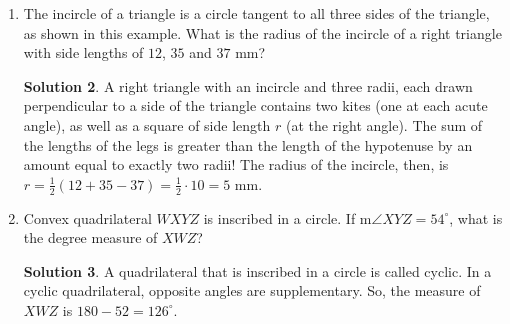 \documentclass{article}
\theoremstyle{definition}
\newtheorem*{solution}{Solution}
\begin{document}
\begin{multicols}{2}
\begin{enumerate}
\begin{center}
            \end{center}
            \begin{solution}
                Since $\angle ABC$ is one-half the sum of arc $\stackrel{\mbox{\large$\frown$}}{AB}$ and arc $\stackrel{\mbox{\large$\frown$}}{DE}$, we have $\angle ACB = 50^{\circ}$.
                Since $\angle ACB + \angle AC = 180^{\circ}$, we find that $\angle ACD = 130^{\circ}$.
            \end{solution}
        \item The incircle of a triangle is a circle tangent to all three sides of the triangle, as shown in this example.
            What is the radius of the incircle of a right triangle with side lengths of $12$, $35$ and $37$ mm?
            \begin{center}
            \end{center}
            \begin{solution}
                A right triangle with an incircle and three radii, each drawn perpendicular to a side of the triangle contains two kites (one at each acute angle), as well as a square of side length $r$ (at the right angle).
                The sum of the lengths of the legs is greater than the length of the hypotenuse by an amount equal to exactly two radii!
                The radius of the incircle, then, is $r = \frac{1}{2} (12 + 35 - 37) = \frac{1}{2} \cdot 10 = 5$ mm.
            \end{solution}
        \item Convex quadrilateral $WXYZ$ is inscribed in a circle.
            If m$\angle XYZ = 54^{\circ}$, what is the degree measure of $XWZ$?
            \begin{solution}
                A quadrilateral that is inscribed in a circle is called cyclic.
                In a cyclic quadrilateral, opposite angles are supplementary.
                So, the measure of $XWZ$ is $180 - 52 = 126^{\circ}$.
            \end{solution}
    \end{enumerate}
\end{multicols}
\end{document}
